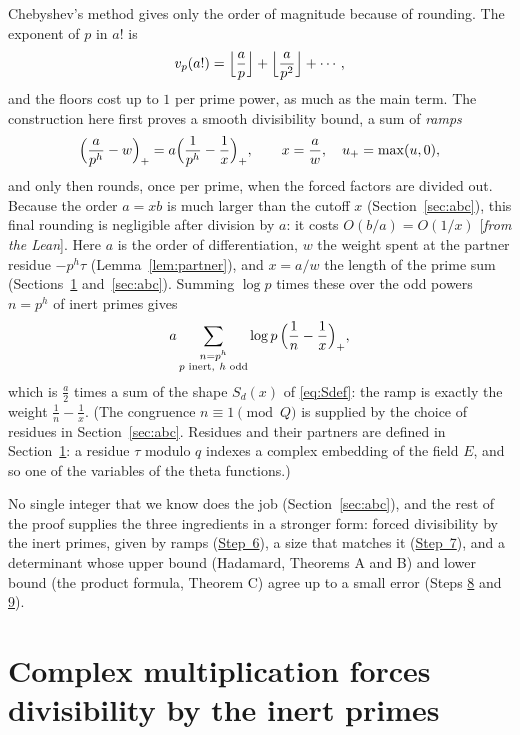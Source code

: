 \documentclass[11pt]{amsart}
\numberwithin{equation}{section}
\theoremstyle{definition}
\theoremstyle{remark}
\newcommand{\status}[1]{\textup{[\emph{#1}]}}
\begin{document}
Chebyshev's method gives only the order of magnitude because of rounding. The exponent of $p$ in $a!$ is
\begin{equation}
 v_p(a!)=\Bigl\lfloor\frac ap\Bigr\rfloor+\Bigl\lfloor\frac a{p^2}\Bigr\rfloor+\cdots,
\end{equation}
and the floors cost up to $1$ per prime power, as much as the main term. The construction here first proves a smooth divisibility bound, a sum of \emph{ramps}
\begin{equation}\label{eq:ramp}
 \Bigl(\frac a{p^h}-w\Bigr)_+=a\Bigl(\frac1{p^h}-\frac1x\Bigr)_+,\qquad x=\frac aw,\quad u_+=\max(u,0),
\end{equation}
and only then rounds, once per prime, when the forced factors are divided out. Because the order $a=xb$ is much larger than the cutoff $x$ (Section~\ref{sec:abc}), this final rounding is negligible after division by $a$: it costs $O(b/a)=O(1/x)$ \status{from the Lean}. Here $a$ is the order of differentiation, $w$ the weight spent at the partner residue $-p^h\tau$ (Lemma~\ref{lem:partner}), and $x=a/w$ the length of the prime sum (Sections~\ref{sec:cm} and~\ref{sec:abc}). Summing $\log p$ times these over the odd powers $n=p^h$ of inert primes gives
\begin{equation}
 a\sum_{\substack{n=p^h\\ p\text{ inert},\ h\text{ odd}}}\log p\,\Bigl(\frac1n-\frac1x\Bigr)_+,
\end{equation}
which is $\frac a2$ times a sum of the shape $S_d(x)$ of \eqref{eq:Sdef}: the ramp is exactly the weight $\frac1n-\frac1x$. (The congruence $n\equiv1\pmod Q$ is supplied by the choice of residues in Section~\ref{sec:abc}. Residues and their partners are defined in Section~\ref{sec:cm}: a residue $\tau$ modulo $q$ indexes a complex embedding of the field $E$, and so one of the variables of the theta functions.)

No single integer that we know does the job (Section~\ref{sec:abc}), and the rest of the proof supplies the three ingredients in a stronger form: forced divisibility by the inert primes, given by ramps (\hyperref[step:6]{Step~6}), a size that matches it (\hyperref[step:7]{Step~7}), and a determinant whose upper bound (Hadamard, Theorems A and B) and lower bound (the product formula, Theorem C) agree up to a small error (Steps \hyperref[step:8]{8} and \hyperref[step:9]{9}).

\section{Complex multiplication forces divisibility by the inert primes}\label{sec:cm}
\end{document}
